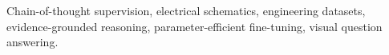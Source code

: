 \documentclass{ieeeaccess}
\begin{document}
\history{}
\doi{}

\begin{abstract}

\end{abstract}
\begin{keywords}
Chain-of-thought supervision, electrical schematics, engineering datasets, evidence-grounded reasoning, parameter-efficient fine-tuning, visual question answering.
\end{keywords}
\titlepgskip=-15pt
\maketitle






\FloatBarrier


\appendices

\FloatBarrier


\EOD
\end{document}
